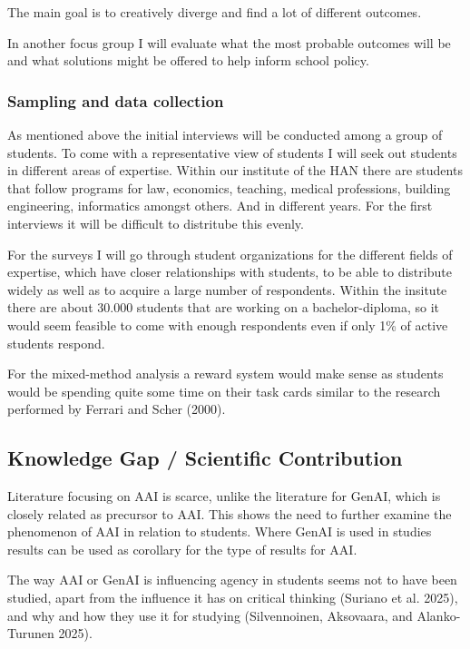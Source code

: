 \documentclass[
  letterpaper,
  DIV=11,
  numbers=noendperiod]{scrartcl}
\begin{document}
The main goal is to creatively diverge and find a lot of different
outcomes.

In another focus group I will evaluate what the most probable outcomes
will be and what solutions might be offered to help inform school
policy.

\subsubsection{Sampling and data
collection}\label{sampling-and-data-collection}

As mentioned above the initial interviews will be conducted among a
group of students. To come with a representative view of students I will
seek out students in different areas of expertise. Within our institute
of the HAN there are students that follow programs for law, economics,
teaching, medical professions, building engineering, informatics amongst
others. And in different years. For the first interviews it will be
difficult to distritube this evenly.

For the surveys I will go through student organizations for the
different fields of expertise, which have closer relationships with
students, to be able to distribute widely as well as to acquire a large
number of respondents. Within the insitute there are about 30.000
students that are working on a bachelor-diploma, so it would seem
feasible to come with enough respondents even if only 1\% of active
students respond.

For the mixed-method analysis a reward system would make sense as
students would be spending quite some time on their task cards similar
to the research performed by Ferrari and Scher (2000).

\subsection{Knowledge Gap / Scientific
Contribution}\label{knowledge-gap-scientific-contribution}

Literature focusing on AAI is scarce, unlike the literature for GenAI,
which is closely related as precursor to AAI. This shows the need to
further examine the phenomenon of AAI in relation to students. Where
GenAI is used in studies results can be used as corollary for the type
of results for AAI.

The way AAI or GenAI is influencing agency in students seems not to have
been studied, apart from the influence it has on critical thinking
(Suriano et al. 2025), and why and how they use it for studying
(Silvennoinen, Aksovaara, and Alanko-Turunen 2025).
\end{document}
